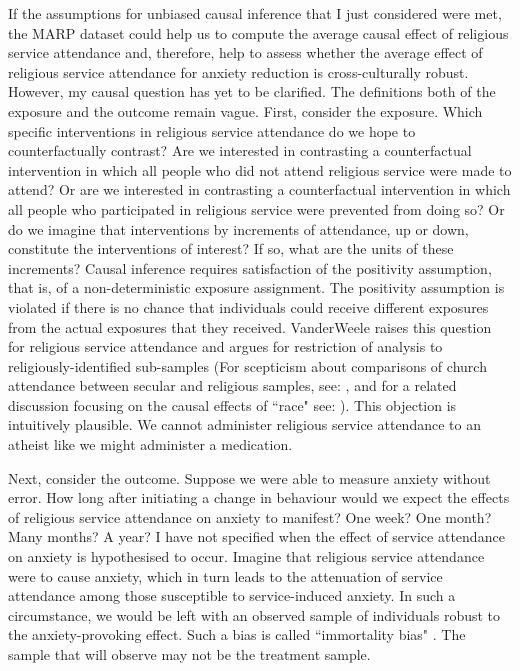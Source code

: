 \documentclass[]{interact}
\theoremstyle{plain}%
\theoremstyle{definition}
\theoremstyle{remark}
\begin{document}
If the assumptions for unbiased causal inference that I just considered were met, the MARP dataset could help us to compute the average causal effect of religious service attendance and, therefore, help to assess whether the average effect of religious service attendance for anxiety reduction is cross-culturally robust. However, my causal question has yet to be clarified. The definitions both of the exposure and the outcome remain vague. First, consider the exposure. Which specific interventions in religious service attendance do we hope to counterfactually contrast? Are we interested in contrasting a counterfactual intervention in which all people who did not attend religious service were made to attend? Or are we interested in contrasting a counterfactual intervention in which all people who participated in religious service were prevented from doing so? Or do we imagine that interventions by increments of attendance, up or down, constitute the interventions of interest? If so, what are the units of these increments? Causal inference requires satisfaction of the positivity assumption, that is, of a non-deterministic exposure assignment. The positivity assumption is violated if there is no chance that individuals could receive different exposures from the actual exposures that they received. VanderWeele raises this question for religious service attendance and argues for restriction of analysis to religiously-identified sub-samples \cite{vanderweele_causal_2017}
(For scepticism about comparisons of church attendance between secular and religious samples, see: \citet{vanderweele_religion_2017}, 
and for a related discussion focusing on the causal effects of “race" see: \citet{vanderweele_causal_2014}).
This objection is intuitively plausible. We cannot administer religious service attendance to an atheist like we might administer a medication.

Next, consider the outcome. Suppose we were able to measure anxiety without error. How long after initiating a change in behaviour would we expect the effects of religious service attendance on anxiety to manifest? One week? One month? Many months? A year? I have not specified when the effect of service attendance on anxiety is hypothesised to occur. Imagine that religious service attendance were to cause anxiety, which in turn leads to the attenuation of service attendance among those susceptible to service-induced anxiety. In such a circumstance, we would be left with an observed sample of individuals robust to the anxiety-provoking effect. Such a bias is called “immortality bias" \citep[see:][]{hernan_using_2016, hernan_specifying_2016}. The sample that will observe may not be the treatment sample. 
\end{document}
